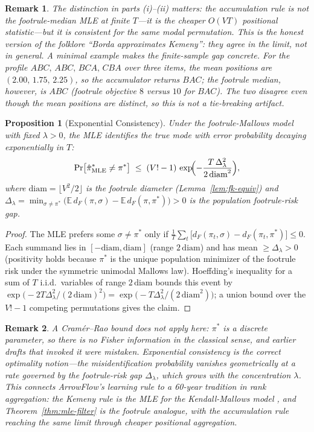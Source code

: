 \documentclass[12pt]{article}
\newcommand{\E}{\mathbb{E}}
\newtheorem{proposition}[theorem]{Proposition}
\newtheorem{remark}{Remark}
\begin{document}
\begin{remark}
The distinction in parts (i)--(ii) matters: the accumulation rule is \emph{not} the footrule-median MLE at finite $T$---it is the cheaper $O(VT)$ positional statistic---but it is consistent for the same modal permutation. This is the honest version of the folklore ``Borda approximates Kemeny'': they agree in the limit, not in general. A minimal example makes the finite-sample gap concrete. For the profile $ABC,\,ABC,\,BCA,\,CBA$ over three items, the mean positions are $(2.00,\,1.75,\,2.25)$, so the accumulator returns $BAC$; the footrule median, however, is $ABC$ (footrule objective $8$ versus $10$ for $BAC$). The two disagree even though the mean positions are distinct, so this is not a tie-breaking artifact.
\end{remark}

\begin{proposition}[Exponential Consistency]
\label{prop:exp-consistency}
Under the footrule-Mallows model with fixed $\lambda > 0$, the MLE identifies the true mode with error probability decaying exponentially in $T$:
\[
\Pr\bigl[\hat{\pi}^*_{\mathrm{MLE}} \neq \pi^*\bigr] \;\le\; (V!-1)\,\exp\!\Bigl(-\frac{T\,\Delta_\lambda^2}{2\,\mathrm{diam}^2}\Bigr),
\]
where $\mathrm{diam} = \lfloor V^2/2\rfloor$ is the footrule diameter (Lemma~\ref{lem:fk-equiv}) and
$\Delta_\lambda = \min_{\sigma \neq \pi^*}\bigl(\E\,d_F(\pi,\sigma) - \E\,d_F(\pi,\pi^*)\bigr) > 0$ is the population footrule-risk gap.
\end{proposition}

\begin{proof}
The MLE prefers some $\sigma \neq \pi^*$ only if $\tfrac1T\sum_t\bigl[d_F(\pi_t,\sigma) - d_F(\pi_t,\pi^*)\bigr] \le 0$. Each summand lies in $[-\mathrm{diam}, \mathrm{diam}]$ (range $2\,\mathrm{diam}$) and has mean $\ge \Delta_\lambda > 0$ (positivity holds because $\pi^*$ is the unique population minimizer of the footrule risk under the symmetric unimodal Mallows law). Hoeffding's inequality for a sum of $T$ i.i.d.\ variables of range $2\,\mathrm{diam}$ bounds this event by $\exp\bigl(-2T\Delta_\lambda^2/(2\,\mathrm{diam})^2\bigr) = \exp\bigl(-T\Delta_\lambda^2/(2\,\mathrm{diam}^2)\bigr)$; a union bound over the $V!-1$ competing permutations gives the claim.
\end{proof}

\begin{remark}
A Cram\'er--Rao bound does \emph{not} apply here: $\pi^*$ is a discrete parameter, so there is no Fisher information in the classical sense, and earlier drafts that invoked it were mistaken. Exponential consistency is the correct optimality notion---the misidentification probability vanishes geometrically at a rate governed by the footrule-risk gap $\Delta_\lambda$, which grows with the concentration $\lambda$. This connects ArrowFlow's learning rule to a 60-year tradition in rank aggregation: the Kemeny rule is the MLE for the Kendall-Mallows model \citep{conitzer2005voting}, and Theorem~\ref{thm:mle-filter} is the footrule analogue, with the accumulation rule reaching the same limit through cheaper positional aggregation.
\end{remark}
\end{document}
